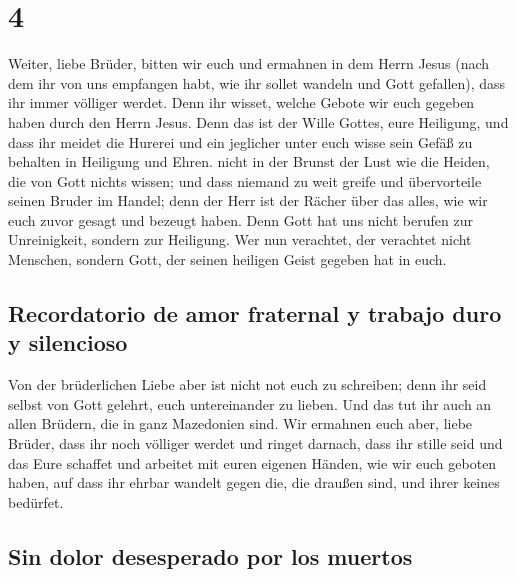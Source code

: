 \hypertarget{section-3}{%
\section{4}\label{section-3}}

 Weiter, liebe Brüder, bitten wir euch und ermahnen in dem
Herrn Jesus (nach dem ihr von uns empfangen habt, wie ihr sollet wandeln
und Gott gefallen), dass ihr immer völliger werdet.  Denn
ihr wisset, welche Gebote wir euch gegeben haben durch den Herrn Jesus.
 Denn das ist der Wille Gottes, eure Heiligung, und dass
ihr meidet die Hurerei  und ein jeglicher unter euch wisse
sein Gefäß zu behalten in Heiligung und Ehren.  nicht in
der Brunst der Lust wie die Heiden, die von Gott nichts wissen;
 und dass niemand zu weit greife und übervorteile seinen
Bruder im Handel; denn der Herr ist der Rächer über das alles, wie wir
euch zuvor gesagt und bezeugt haben.  Denn Gott hat uns
nicht berufen zur Unreinigkeit, sondern zur Heiligung. 
Wer nun verachtet, der verachtet nicht Menschen, sondern Gott, der
seinen heiligen Geist gegeben hat in euch.

\hypertarget{recordatorio-de-amor-fraternal-y-trabajo-duro-y-silencioso}{%
\subsection{Recordatorio de amor fraternal y trabajo duro y
silencioso}\label{recordatorio-de-amor-fraternal-y-trabajo-duro-y-silencioso}}

 Von der brüderlichen Liebe aber ist nicht not euch zu
schreiben; denn ihr seid selbst von Gott gelehrt, euch untereinander zu
lieben.  Und das tut ihr auch an allen Brüdern, die in
ganz Mazedonien sind. Wir ermahnen euch aber, liebe Brüder, dass ihr
noch völliger werdet  und ringet darnach, dass ihr stille
seid und das Eure schaffet und arbeitet mit euren eigenen Händen, wie
wir euch geboten haben,  auf dass ihr ehrbar wandelt
gegen die, die draußen sind, und ihrer keines bedürfet.

\hypertarget{sin-dolor-desesperado-por-los-muertos}{%
\subsection{Sin dolor desesperado por los
muertos}\label{sin-dolor-desesperado-por-los-muertos}}

